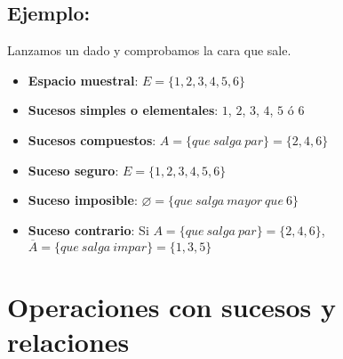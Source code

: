 \subsection{Ejemplo:} Lanzamos un dado y comprobamos la cara que sale.
\begin{itemize}
\item \textbf{Espacio muestral}: $E=\lbrace 1,2,3,4,5,6 \rbrace $
\item \textbf{Sucesos simples o elementales}: $1$, $2$, $3$, $4$, $5$ ó $6$
\item \textbf{Sucesos compuestos}: $A=\lbrace que\ salga\ par\rbrace=\lbrace2,4,6\rbrace$
\item \textbf{Suceso seguro}: $E=\lbrace 1,2,3,4,5,6 \rbrace $
\item \textbf{Suceso imposible}: $\varnothing=\lbrace que\ salga \ mayor \ que \ 6\rbrace$
\item \textbf{Suceso contrario}: Si $A=\lbrace que\ salga\ par\rbrace=\lbrace2,4,6\rbrace$, $\overline{A}=\lbrace que\ salga\ impar\rbrace=\lbrace1,3,5\rbrace$ 
\end{itemize}


\section{Operaciones con sucesos y relaciones}

%
%

